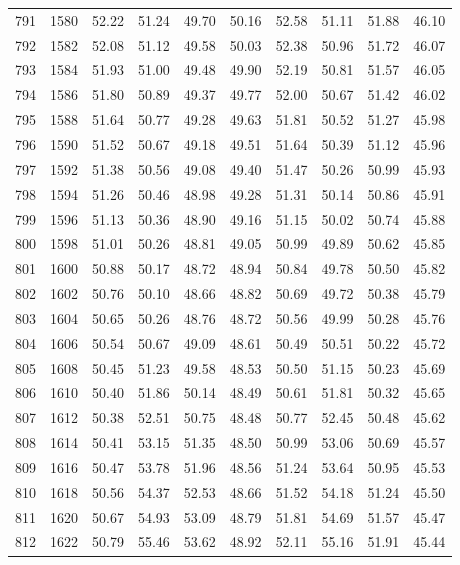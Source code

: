 \begin{longtable}{rrllllllll}
		791 & 1580 & 52.22 & 51.24 & 49.70 & 50.16 & 52.58 & 51.11 & 51.88 & 46.10 \\ 
		792 & 1582 & 52.08 & 51.12 & 49.58 & 50.03 & 52.38 & 50.96 & 51.72 & 46.07 \\ 
		793 & 1584 & 51.93 & 51.00 & 49.48 & 49.90 & 52.19 & 50.81 & 51.57 & 46.05 \\ 
		794 & 1586 & 51.80 & 50.89 & 49.37 & 49.77 & 52.00 & 50.67 & 51.42 & 46.02 \\ 
		795 & 1588 & 51.64 & 50.77 & 49.28 & 49.63 & 51.81 & 50.52 & 51.27 & 45.98 \\ 
		796 & 1590 & 51.52 & 50.67 & 49.18 & 49.51 & 51.64 & 50.39 & 51.12 & 45.96 \\ 
		797 & 1592 & 51.38 & 50.56 & 49.08 & 49.40 & 51.47 & 50.26 & 50.99 & 45.93 \\ 
		798 & 1594 & 51.26 & 50.46 & 48.98 & 49.28 & 51.31 & 50.14 & 50.86 & 45.91 \\ 
		799 & 1596 & 51.13 & 50.36 & 48.90 & 49.16 & 51.15 & 50.02 & 50.74 & 45.88 \\ 
		800 & 1598 & 51.01 & 50.26 & 48.81 & 49.05 & 50.99 & 49.89 & 50.62 & 45.85 \\ 
		801 & 1600 & 50.88 & 50.17 & 48.72 & 48.94 & 50.84 & 49.78 & 50.50 & 45.82 \\ 
		802 & 1602 & 50.76 & 50.10 & 48.66 & 48.82 & 50.69 & 49.72 & 50.38 & 45.79 \\ 
		803 & 1604 & 50.65 & 50.26 & 48.76 & 48.72 & 50.56 & 49.99 & 50.28 & 45.76 \\ 
		804 & 1606 & 50.54 & 50.67 & 49.09 & 48.61 & 50.49 & 50.51 & 50.22 & 45.72 \\ 
		805 & 1608 & 50.45 & 51.23 & 49.58 & 48.53 & 50.50 & 51.15 & 50.23 & 45.69 \\ 
		806 & 1610 & 50.40 & 51.86 & 50.14 & 48.49 & 50.61 & 51.81 & 50.32 & 45.65 \\ 
		807 & 1612 & 50.38 & 52.51 & 50.75 & 48.48 & 50.77 & 52.45 & 50.48 & 45.62 \\ 
		808 & 1614 & 50.41 & 53.15 & 51.35 & 48.50 & 50.99 & 53.06 & 50.69 & 45.57 \\ 
		809 & 1616 & 50.47 & 53.78 & 51.96 & 48.56 & 51.24 & 53.64 & 50.95 & 45.53 \\ 
		810 & 1618 & 50.56 & 54.37 & 52.53 & 48.66 & 51.52 & 54.18 & 51.24 & 45.50 \\ 
		811 & 1620 & 50.67 & 54.93 & 53.09 & 48.79 & 51.81 & 54.69 & 51.57 & 45.47 \\ 
		812 & 1622 & 50.79 & 55.46 & 53.62 & 48.92 & 52.11 & 55.16 & 51.91 & 45.44 \\ 

\end{longtable}
